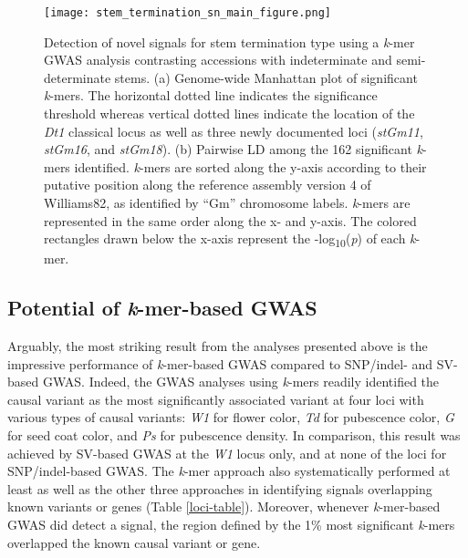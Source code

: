 \begin{figure}
	\centering
	\texttt{[image: stem\_termination\_sn\_main\_figure.png]}
	\caption[Detection of novel signals for stem termination type
	using a \textit{k}-mer GWAS analysis contrasting accessions with
	indeterminate and semi-determinate stems]{Detection of novel signals for stem termination type
	using a \textit{k}-mer GWAS analysis contrasting accessions with
	indeterminate and semi-determinate stems.
	(a) Genome-wide Manhattan plot of significant \textit{k}-mers.
	The horizontal dotted line indicates the significance threshold
	whereas vertical dotted lines indicate the location of the \textit{Dt1}
	classical locus as well as three newly documented loci (\textit{stGm11},
	\textit{stGm16}, and \textit{stGm18}).
	(b) Pairwise LD among the 162 significant \textit{k}-mers identified.
	\textit{k}-mers are sorted along the y-axis according to their
	putative position along the reference assembly version 4 of Williams82,
	as identified by ``Gm'' chromosome labels. \textit{k}-mers are
	represented in the same order along the x- and y-axis. The colored
	rectangles drawn below the x-axis represent the
	-log\textsubscript{10}(\textit{p}) of each \textit{k}-mer.}
	\label{stem-termination-main-figure}
\end{figure}

\subsection*{Potential of \emph{k}-mer-based GWAS}
\label{sv-gwas-potential-kmers}

Arguably, the most striking result from the analyses presented above is the
impressive performance of \emph{k}-mer-based GWAS compared to SNP/indel- and
SV-based GWAS. Indeed, the GWAS analyses using \emph{k}-mers readily identified
the causal variant as the most significantly associated variant at four loci
with various types of causal variants: \emph{W1} for flower color, \emph{Td}
for pubescence color, \emph{G} for seed coat color, and \emph{Ps} for
pubescence density. In comparison, this result was achieved by SV-based GWAS
at the \textit{W1} locus only, and at none of the loci for SNP/indel-based GWAS.
The \textit{k}-mer approach also systematically performed at least as well as
the other three approaches in identifying signals overlapping known variants or genes
(Table \ref{loci-table}). Moreover, whenever \textit{k}-mer-based GWAS did
detect a signal, the region defined by the 1\% most significant \textit{k}-mers
overlapped the known causal variant or gene. 

